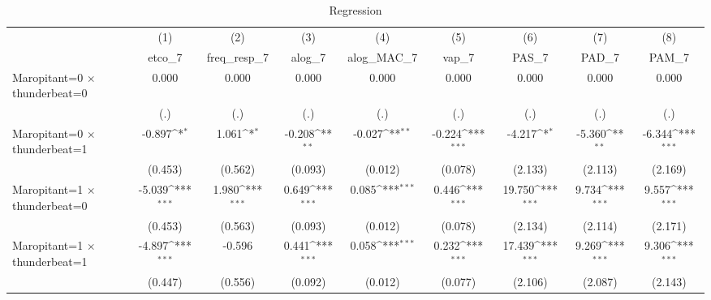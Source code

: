 \begin{table}[htbp]\centering
\def\sym#1{\ifmmode^{#1}\else\(^{#1}\)\fi}
\caption{Regression}
\begin{tabular}{l*{8}{c}}
\toprule
                    &\multicolumn{1}{c}{(1)}&\multicolumn{1}{c}{(2)}&\multicolumn{1}{c}{(3)}&\multicolumn{1}{c}{(4)}&\multicolumn{1}{c}{(5)}&\multicolumn{1}{c}{(6)}&\multicolumn{1}{c}{(7)}&\multicolumn{1}{c}{(8)}\\
                    &\multicolumn{1}{c}{etco\_7}&\multicolumn{1}{c}{freq\_resp\_7}&\multicolumn{1}{c}{alog\_7}&\multicolumn{1}{c}{alog\_MAC\_7}&\multicolumn{1}{c}{vap\_7}&\multicolumn{1}{c}{PAS\_7}&\multicolumn{1}{c}{PAD\_7}&\multicolumn{1}{c}{PAM\_7}\\
\midrule
Maropitant=0 $\times$ thunderbeat=0&       0.000         &       0.000         &       0.000         &       0.000         &       0.000         &       0.000         &       0.000         &       0.000         \\
                    &         (.)         &         (.)         &         (.)         &         (.)         &         (.)         &         (.)         &         (.)         &         (.)         \\
\addlinespace
Maropitant=0 $\times$ thunderbeat=1&      -0.897\sym{*}  &       1.061\sym{*}  &      -0.208\sym{**} &      -0.027\sym{**} &      -0.224\sym{***}&      -4.217\sym{*}  &      -5.360\sym{**} &      -6.344\sym{***}\\
                    &     (0.453)         &     (0.562)         &     (0.093)         &     (0.012)         &     (0.078)         &     (2.133)         &     (2.113)         &     (2.169)         \\
\addlinespace
Maropitant=1 $\times$ thunderbeat=0&      -5.039\sym{***}&       1.980\sym{***}&       0.649\sym{***}&       0.085\sym{***}&       0.446\sym{***}&      19.750\sym{***}&       9.734\sym{***}&       9.557\sym{***}\\
                    &     (0.453)         &     (0.563)         &     (0.093)         &     (0.012)         &     (0.078)         &     (2.134)         &     (2.114)         &     (2.171)         \\
\addlinespace
Maropitant=1 $\times$ thunderbeat=1&      -4.897\sym{***}&      -0.596         &       0.441\sym{***}&       0.058\sym{***}&       0.232\sym{***}&      17.439\sym{***}&       9.269\sym{***}&       9.306\sym{***}\\
                    &     (0.447)         &     (0.556)         &     (0.092)         &     (0.012)         &     (0.077)         &     (2.106)         &     (2.087)         &     (2.143)         \\

\end{tabular}
\end{table}
